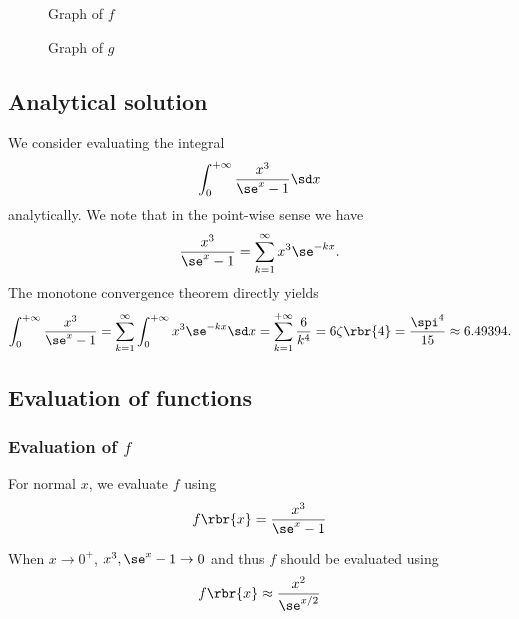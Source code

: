 \documentclass[english, nochinese]{pnote}
\begin{document}
\begin{figure}[htbp]
\centering

\caption{Graph of $f$}
\label{Fig:GraphF}
\end{figure}

\begin{figure}[htbp]
\centering

\caption{Graph of $g$}
\label{Fig:GraphG}
\end{figure}

\subsection{Analytical solution}

We consider evaluating the integral
\begin{equation}
\int_0^{+\infty} \frac{x^3}{ \se^x - 1 } \sd x
\end{equation}
analytically. We note that in the point-wise sense we have
\begin{equation}
\frac{x^3}{ \se^x - 1 } = \sum_{ k = 1 }^{\infty} x^3 \se^{ -k x }.
\end{equation}
The monotone convergence theorem directly yields
\begin{equation}
\int_0^{+\infty} \frac{x^3}{ \se^x - 1 } = \sum_{ k = 1 }^{\infty} \int_0^{+\infty} x^3 \se^{ -k x } \sd x = \sum_{ k = 1 }^{+\infty} \frac{6}{k^4} = 6 \zeta \rbr{4} = \frac{\spi^4}{15} \approx 6.49394.
\end{equation}

\subsection{Evaluation of functions}

\subsubsection{Evaluation of $f$}

For normal $x$, we evaluate $f$ using
\begin{equation} \label{Eq:EvalFNorm}
f \rbr{x} = \frac{x^3}{ \se^x - 1 }
\end{equation}

When $ x \rightarrow 0^+ $, $ x^3, \se^x - 1 \rightarrow 0 $ and thus $f$ should be evaluated using
\begin{equation} \label{Eq:EvalFApprox}
f \rbr{x} \approx \frac{x^2}{\se^{ x / 2 }}
\end{equation}
\end{document}
